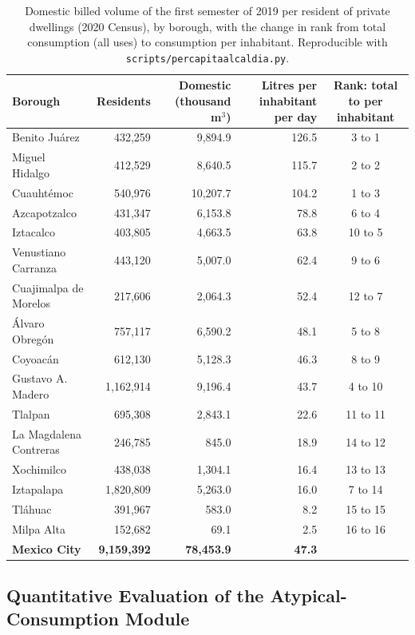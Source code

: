 \documentclass[runningheads]{llncs}
\newenvironment{nuevobloque}{}{}
\renewcommand{\_}{\origunderscore\allowbreak}
\begin{document}
\begin{nuevobloque}
\begin{table}[tbp]
\centering
\caption{Domestic billed volume of the first semester of 2019 per resident of
private dwellings (2020 Census), by borough, with the change in rank from total
consumption (all uses) to consumption per inhabitant. Reproducible with
\texttt{scripts/per\_capita\_alcaldia.py}.}
\label{tab:percapita}
\begin{tabular}{lrrrc}
\hline
\textbf{Borough} & \textbf{Residents} & \textbf{Domestic (thousand m$^3$)} & \textbf{Litres per inhabitant per day} & \textbf{Rank: total to per inhabitant} \\
\hline
Benito Ju\'arez & 432,259 & 9,894.9 & 126.5 & 3 to 1 \\
Miguel Hidalgo & 412,529 & 8,640.5 & 115.7 & 2 to 2 \\
Cuauht\'emoc & 540,976 & 10,207.7 & 104.2 & 1 to 3 \\
Azcapotzalco & 431,347 & 6,153.8 & 78.8 & 6 to 4 \\
Iztacalco & 403,805 & 4,663.5 & 63.8 & 10 to 5 \\
Venustiano Carranza & 443,120 & 5,007.0 & 62.4 & 9 to 6 \\
Cuajimalpa de Morelos & 217,606 & 2,064.3 & 52.4 & 12 to 7 \\
\'Alvaro Obreg\'on & 757,117 & 6,590.2 & 48.1 & 5 to 8 \\
Coyoac\'an & 612,130 & 5,128.3 & 46.3 & 8 to 9 \\
Gustavo A. Madero & 1,162,914 & 9,196.4 & 43.7 & 4 to 10 \\
Tlalpan & 695,308 & 2,843.1 & 22.6 & 11 to 11 \\
La Magdalena Contreras & 246,785 & 845.0 & 18.9 & 14 to 12 \\
Xochimilco & 438,038 & 1,304.1 & 16.4 & 13 to 13 \\
Iztapalapa & 1,820,809 & 5,263.0 & 16.0 & 7 to 14 \\
Tl\'ahuac & 391,967 & 583.0 & 8.2 & 15 to 15 \\
Milpa Alta & 152,682 & 69.1 & 2.5 & 16 to 16 \\
\hline
\textbf{Mexico City} & \textbf{9,159,392} & \textbf{78,453.9} & \textbf{47.3} & \\
\hline
\end{tabular}
\end{table}
\end{nuevobloque}

\subsection{Quantitative Evaluation of the Atypical-Consumption Module}
\end{document}
